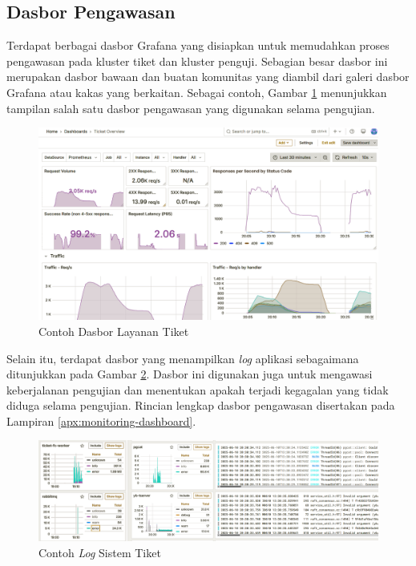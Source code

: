 \subsection{Dasbor Pengawasan}

Terdapat berbagai dasbor Grafana yang disiapkan untuk memudahkan proses pengawasan pada kluster tiket dan kluster penguji. Sebagian besar dasbor ini merupakan dasbor bawaan dan buatan komunitas yang diambil dari galeri dasbor Grafana atau kakas yang berkaitan. Sebagai contoh, Gambar \ref{fig:ticket-dashboard-example} menunjukkan tampilan salah satu dasbor pengawasan yang digunakan selama pengujian.

\begin{figure}[H]
    \centering
    \includegraphics[width=1\textwidth]{resources/chapter-4/ticket-dashboard.png}
    \caption{Contoh Dasbor Layanan Tiket}
    \label{fig:ticket-dashboard-example}
\end{figure}

Selain itu, terdapat dasbor yang menampilkan \textit{log} aplikasi sebagaimana ditunjukkan pada Gambar \ref{fig:log-example}. Dasbor ini digunakan juga untuk mengawasi keberjalanan pengujian dan menentukan apakah terjadi kegagalan yang tidak diduga selama pengujian. Rincian lengkap dasbor pengawasan disertakan pada Lampiran \ref{apx:monitoring-dashboard}.

\begin{figure}[H]
    \centering
    \includegraphics[width=1\textwidth]{resources/chapter-4/log.png}
    \caption{Contoh \textit{Log} Sistem Tiket}
    \label{fig:log-example}
\end{figure}
